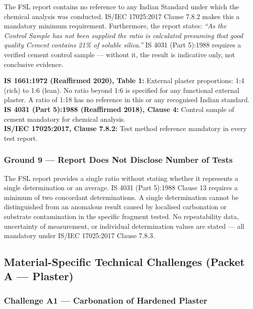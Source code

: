 \documentclass[12pt, a4paper]{article}
\begin{document}
\begin{groundbox}
The FSL report contains no reference to any Indian Standard under which the chemical analysis was conducted. IS/IEC 17025:2017 Clause 7.8.2 makes this a mandatory minimum requirement. Furthermore, the report states: \textit{``As the Control Sample has not been supplied the ratio is calculated presuming that good quality Cement contains 21\% of soluble silica.''} IS 4031 (Part 5):1988 requires a verified cement control sample --- without it, the result is indicative only, not conclusive evidence.
\end{groundbox}

\begin{standardbox}
\textbf{IS 1661:1972 (Reaffirmed 2020), Table 1:} External plaster proportions: 1:4 (rich) to 1:6 (lean). No ratio beyond 1:6 is specified for any functional external plaster. A ratio of 1:18 has no reference in this or any recognised Indian standard.\\
\textbf{IS 4031 (Part 5):1988 (Reaffirmed 2018), Clause 4:} Control sample of cement mandatory for chemical analysis.\\
\textbf{IS/IEC 17025:2017, Clause 7.8.2:} Test method reference mandatory in every test report.
\end{standardbox}

\subsubsection{Ground 9 --- Report Does Not Disclose Number of Tests}

The FSL report provides a single ratio without stating whether it represents a single determination or an average. IS 4031 (Part 5):1988 Clause 13 requires a minimum of two concordant determinations. A single determination cannot be distinguished from an anomalous result caused by localised carbonation or substrate contamination in the specific fragment tested. No repeatability data, uncertainty of measurement, or individual determination values are stated --- all mandatory under IS/IEC 17025:2017 Clause 7.8.3.

\subsection{Material-Specific Technical Challenges (Packet A --- Plaster)}

\subsubsection{Challenge A1 --- Carbonation of Hardened Plaster}
\end{document}
